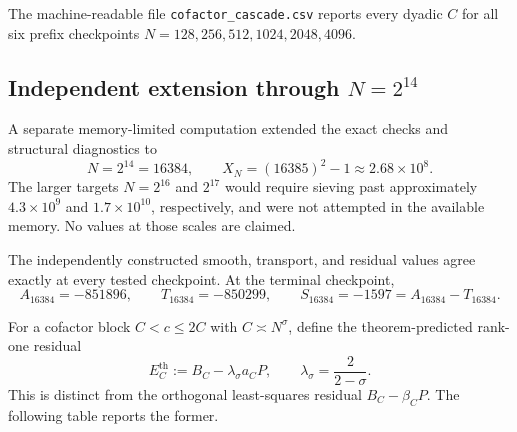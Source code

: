\documentclass[11pt]{article}
\theoremstyle{definition}
\theoremstyle{remark}
\newcommand{\1}{\mathbf{1}}
\begin{document}
The machine-readable file \texttt{cofactor\_cascade.csv} reports every
dyadic $C$ for all six prefix checkpoints
$N=128,256,512,1024,2048,4096$.


\subsection{Independent extension through $N=2^{14}$}
\label{subsec:numerics-16384}

A separate memory-limited computation extended the exact checks and structural
diagnostics to
\begin{equation}
 N=2^{14}=16384,
 \qquad
 X_N=(16385)^2-1\approx2.68\times10^8.
 \label{eq:extended-range-16384}
\end{equation}
The larger targets $N=2^{16}$ and $2^{17}$ would require sieving past
approximately $4.3\times10^9$ and $1.7\times10^{10}$, respectively, and were not
attempted in the available memory.  No values at those scales are claimed.

The independently constructed smooth, transport, and residual values agree
exactly at every tested checkpoint.  At the terminal checkpoint,
\begin{equation}
 \boxed{
 A_{16384}=-851896,
 \qquad
 T_{16384}=-850299,
 \qquad
 S_{16384}=-1597=A_{16384}-T_{16384}.
 }
 \label{eq:extended-terminal-identity}
\end{equation}

For a cofactor block $C<c\le2C$ with $C\asymp N^\sigma$, define the
theorem-predicted rank-one residual
\begin{equation}
 E_C^{\mathrm{th}}
 :=B_C-\lambda_\sigma a_C P,
 \qquad
 \lambda_\sigma=\frac{2}{2-\sigma}.
 \label{eq:theorem-predicted-residual}
\end{equation}
This is distinct from the orthogonal least-squares residual
$B_C-\widehat\beta_CP$.  The following table reports the former.
\end{document}
